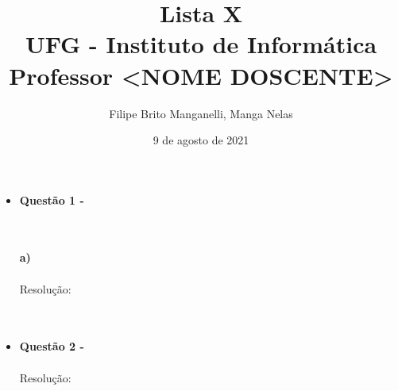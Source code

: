 \documentclass[a4paper,12pt]{article}
\begin{document}
\title{\textbf{Lista X} \\\vspace{5}\small UFG - Instituto de Informática\\\large Professor <NOME DOSCENTE>}

\author{Filipe Brito Manganelli, Manga Nelas}

\date{9 de agosto de 2021}

\maketitle

\begin{itemize} %
    \item []\textbf{Questão 1 -} %
     
     \\\\\textbf{a)} %
     \\\\Resolução:
     \\\\ %
    
     
     \\ %
     
     \item [] \textbf{Questão 2 -}
     \\\\Resolução:
     \\\\
     
     
     \\ %
\end{itemize}
    
\end{document}

